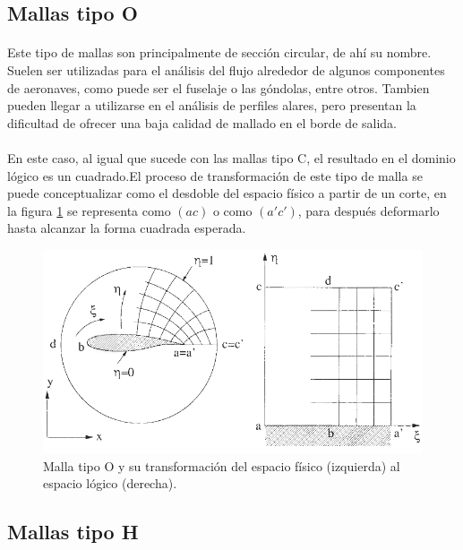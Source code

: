 \documentclass[letterpaper, openright, 12pt]{book}
\begin{document}
		\subsection{Mallas tipo O}
			\paragraph*{}
				Este tipo de mallas son principalmente de sección circular, de ahí su nombre. Suelen ser utilizadas para el análisis del flujo alrededor de algunos componentes de aeronaves, como puede ser el fuselaje o las góndolas, entre otros.\cite{vladimir-grid} Tambien pueden llegar a utilizarse en el análisis de perfiles alares, pero presentan la dificultad de ofrecer una baja calidad de mallado en el borde de salida.\cite{blazek}\cite{best-practices-grid-generation}
			\paragraph*{}
				En este caso, al igual que sucede con las mallas tipo C, el resultado en el dominio lógico es un cuadrado.El proceso de transformación de este tipo de malla se puede conceptualizar como el desdoble del espacio físico a partir de un corte, en la figura \ref{fig:malla-o} se representa como $(ac)$ o como $(a'c')$, para después deformarlo hasta alcanzar la forma cuadrada esperada.
			\begin{figure}[htbp!]
				\centering
				\includegraphics[width=170mm]{./Imagenes/malla-o}
				\captionsetup{justification=centering, margin=2cm}
				\caption[Malla tipo O]{Malla tipo O y su transformación del espacio físico (izquierda) al espacio lógico (derecha). \cite{blazek}}
				\label{fig:malla-o}
			\end{figure}
		\subsection{Mallas tipo H}
\end{document}
